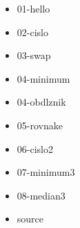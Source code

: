 



\begin{itemize}
\item 01-hello
\item 02-cislo
\item 03-swap
\item 04-minimum
\item 04-obdlznik
\item 05-rovnake
\item 06-cislo2
\item 07-minimum3
\item 08-median3
\item source
\end{itemize}

